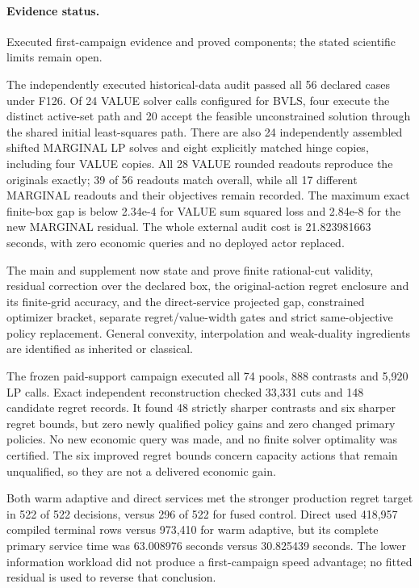 \paragraph{Evidence status.} Executed first-campaign evidence and proved components; the stated scientific limits remain open.

The independently executed historical-data audit passed all 56 declared cases under F126. Of 24 VALUE solver calls configured for BVLS, four execute the distinct active-set path and 20 accept the feasible unconstrained solution through the shared initial least-squares path. There are also 24 independently assembled shifted MARGINAL LP solves and eight explicitly matched hinge copies, including four VALUE copies. All 28 VALUE rounded readouts reproduce the originals exactly; 39 of 56 readouts match overall, while all 17 different MARGINAL readouts and their objectives remain recorded. The maximum exact finite-box gap is below 2.34e-4 for VALUE sum squared loss and 2.84e-8 for the new MARGINAL residual. The whole external audit cost is 21.823981663 seconds, with zero economic queries and no deployed actor replaced.\par
The main and supplement now state and prove finite rational-cut validity, residual correction over the declared box, the original-action regret enclosure and its finite-grid accuracy, and the direct-service projected gap, constrained optimizer bracket, separate regret/value-width gates and strict same-objective policy replacement. General convexity, interpolation and weak-duality ingredients are identified as inherited or classical.\par
The frozen paid-support campaign executed all 74 pools, 888 contrasts and 5,920 LP calls. Exact independent reconstruction checked 33,331 cuts and 148 candidate regret records. It found 48 strictly sharper contrasts and six sharper regret bounds, but zero newly qualified policy gains and zero changed primary policies. No new economic query was made, and no finite solver optimality was certified. The six improved regret bounds concern capacity actions that remain unqualified, so they are not a delivered economic gain.\par
Both warm adaptive and direct services met the stronger production regret target in 522 of 522 decisions, versus 296 of 522 for fused control. Direct used 418,957 compiled terminal rows versus 973,410 for warm adaptive, but its complete primary service time was 63.008976 seconds versus 30.825439 seconds. The lower information workload did not produce a first-campaign speed advantage; no fitted residual is used to reverse that conclusion.\par
